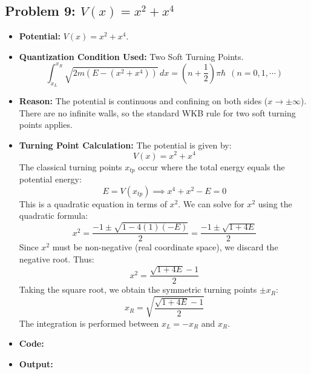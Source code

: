\documentclass[12pt, a4paper, twoside]{article}
\begin{document}
        \subsection{Problem 9: \texorpdfstring{$V(x) = x^2 + x^4$}{V(x) = x\^{}2 + x\^{}4}}
        \begin{itemize}
            \item {\bf Potential: } $V(x) = x^2 + x^4$.
            \item {\bf Quantization Condition Used: } Two Soft Turning Points. $${\int_{x_L}^{x_R} \sqrt{2m(E - (x^2 + x^4))} \, dx} = {\left(n + \frac{1}{2}\right) \pi \hbar} ~~ (n = 0, 1, \cdots)$$
            \item {\bf Reason: }  The potential is continuous and confining on both sides ($x \to \pm \infty$). There are no infinite walls, so the standard WKB rule for two soft turning points applies.
            \item {\bf Turning Point Calculation: } The potential is given by:
            $$ V(x) = x^2 + x^4 $$
            The classical turning points $x_{tp}$ occur where the total energy equals the potential energy:
            $$ E = V(x_{tp}) \implies x^4 + x^2 - E = 0 $$
            This is a quadratic equation in terms of $x^2$. We can solve for $x^2$ using the quadratic formula:
            $$ x^2 = \frac{-1 \pm \sqrt{1 - 4(1)(-E)}}{2} = \frac{-1 \pm \sqrt{1 + 4E}}{2} $$
            Since $x^2$ must be non-negative (real coordinate space), we discard the negative root. Thus:
            $$ x^2 = \frac{\sqrt{1 + 4E} - 1}{2} $$
            Taking the square root, we obtain the symmetric turning points $\pm x_R$:
            $$ \boxed{x_R = \sqrt{\frac{\sqrt{1 + 4E} - 1}{2}}} $$
            The integration is performed between $x_L = -x_R$ and $x_R$.
            \item {\bf Code: } 
            \item {\bf Output: } 
        \end{itemize}
\end{document}
